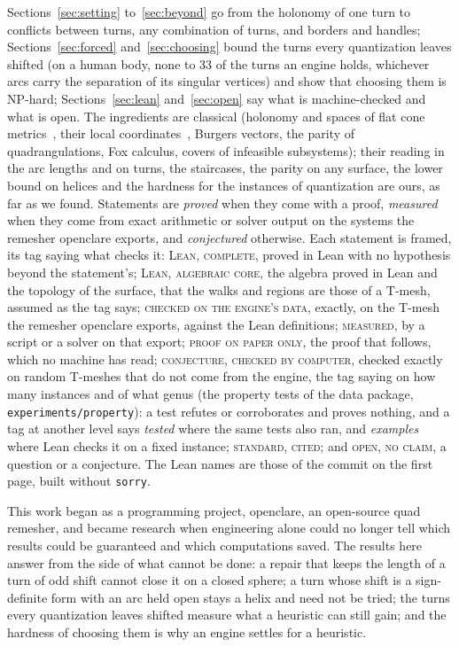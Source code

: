 \documentclass[11pt,a4paper]{article}
\begin{document}
Sections~\ref{sec:setting} to~\ref{sec:beyond} go from the holonomy of one
turn to conflicts between turns, any combination of turns, and borders and
handles; Sections~\ref{sec:forced} and~\ref{sec:choosing} bound the turns
every quantization leaves shifted (on a human body, none to 33 of the turns an
engine holds, whichever arcs carry the separation of its singular vertices)
and show that choosing them is NP-hard;
Sections~\ref{sec:lean} and~\ref{sec:open} say what is machine-checked and
what is open. The ingredients are classical (holonomy and spaces of flat
cone metrics~\cite{veech1993flat}, their local
coordinates~\cite{thurston1998shapes}, Burgers vectors,
the parity of quadrangulations, Fox calculus, covers of infeasible
subsystems); their reading in the arc lengths and on turns, the staircases,
the parity on any surface, the lower bound on helices and the hardness for
the instances of quantization are ours, as far as we found.
\ifdefined\plain
Statements are \emph{proved} when they come with a proof, \emph{measured}
when they come from exact arithmetic or solver output on the systems the
remesher openclare exports, and \emph{conjectured} otherwise.
\else
Each statement is framed, its tag saying what checks it: \textsc{Lean,
complete}, proved in Lean with no hypothesis beyond the statement's;
\textsc{Lean, algebraic core}, the algebra proved in Lean and the topology of
the surface, that the walks and regions are those of a T-mesh, assumed as the
tag says; \textsc{checked on the engine's data}, exactly, on the T-mesh the
remesher openclare exports, against the Lean definitions; \textsc{measured},
by a script or a solver on that export; \textsc{proof on paper only}, the
proof that follows, which no machine has read; \textsc{conjecture, checked by
computer}, checked exactly on random T-meshes that do not come from the
engine, the tag saying on how many instances and of what genus (the property
tests of the data package, \texttt{experiments/property}): a test refutes or
corroborates and proves nothing, and a tag at another level says
\emph{tested} where the same tests also ran, and \emph{examples} where Lean
checks it on a fixed instance; \textsc{standard, cited}; and
\textsc{open, no claim}, a question or a conjecture. The Lean names are those
of the commit on the first page, built without \texttt{sorry}.
\fi

This work began as a programming project, openclare, an open-source quad
remesher, and became research when engineering alone could no longer tell
which results could be guaranteed and which computations saved. The results
here answer from the side of what cannot be done: a repair that keeps
the length of a turn of odd shift cannot close it on a closed sphere; a turn
whose shift is a sign-definite form with an arc held open stays a helix and
need not be tried; the turns every quantization leaves shifted measure what a
heuristic can still gain; and the hardness of choosing them is why an engine
settles for a heuristic.
\end{document}
